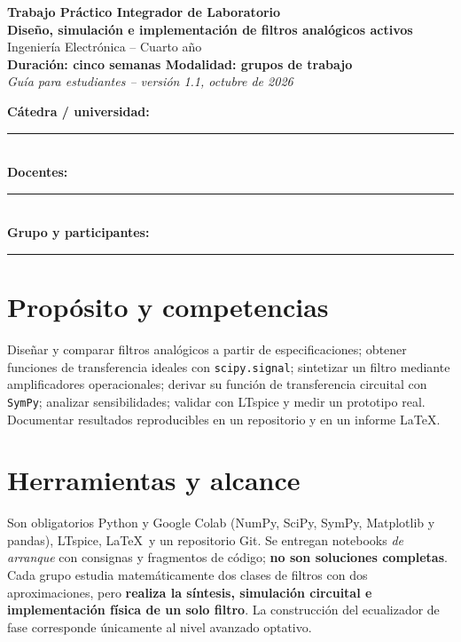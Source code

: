 \documentclass[11pt,a4paper]{article}
\begin{document}
\begin{center}
{\Large\bfseries Trabajo Práctico Integrador de Laboratorio}\\[5pt]
{\LARGE\bfseries Diseño, simulación e implementación de filtros analógicos activos}\\[9pt]
Ingeniería Electrónica -- Cuarto año\\
\textbf{Duración: cinco semanas \quad Modalidad: grupos de trabajo}\\[7pt]
\textit{Guía para estudiantes -- versión 1.1, octubre de 2026}
\end{center}
\noindent\textbf{Cátedra / universidad:} \rule{9cm}{0.4pt}\\
\textbf{Docentes:} \rule{11cm}{0.4pt}\\
\textbf{Grupo y participantes:} \rule{9cm}{0.4pt}
\tableofcontents
\section{Propósito y competencias}
Diseñar y comparar filtros analógicos a partir de especificaciones; obtener funciones de transferencia ideales con \texttt{scipy.signal}; sintetizar un filtro mediante amplificadores operacionales; derivar su función de transferencia circuital con \texttt{SymPy}; analizar sensibilidades; validar con LTspice y medir un prototipo real. Documentar resultados reproducibles en un repositorio y en un informe \LaTeX.
\section{Herramientas y alcance}
Son obligatorios Python y Google Colab (NumPy, SciPy, SymPy, Matplotlib y pandas), LTspice, \LaTeX\ y un repositorio Git. Se entregan notebooks \emph{de arranque} con consignas y fragmentos de código; \textbf{no son soluciones completas}. Cada grupo estudia matemáticamente dos clases de filtros con dos aproximaciones, pero \textbf{realiza la síntesis, simulación circuital e implementación física de un solo filtro}. La construcción del ecualizador de fase corresponde únicamente al nivel avanzado optativo.
\end{document}
